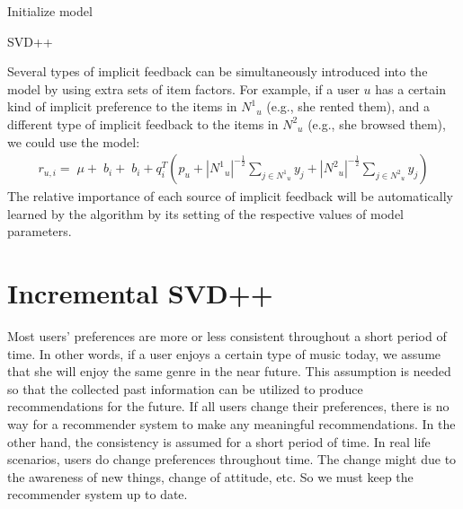 \documentclass[oneside,13pt]{extreport}
\begin{document}
\begin{algorithm}[H]
 Initialize model\;
 \caption{SVD++}
\end{algorithm}
\clearpage

Several types of implicit feedback can be simultaneously introduced into the
model by using extra sets of item factors. For example, if a user $u$ has a certain
kind of implicit preference to the items in ${N^1}_u$ (e.g., she rented them), and a different
type of implicit feedback to the items in ${N^2}_u$ (e.g., she browsed them), we
could use the model: 
\begin{eqnarray}
\label{eq:svd++_pre2}
{r_{u,i}} = \;\mu  + \;{b_i} + \;{b_i} + q_i^T\left( {{p_u} + {{\left| {{N^1}_u} \right|}^{ - \frac{1}{2}}}\sum\limits_{j  \in {N^1}_u} {{y_j}}  + {{\left| {{N^2}_u} \right|}^{ - \frac{1}{2}}}\sum\limits_{j \in   {N^2}_u} {{y_j}} } \right)
\end{eqnarray}
The relative importance of each source of implicit feedback will be automatically
learned by the algorithm by its setting of the respective values of model parameters.
\section{Incremental SVD++}
Most users’ preferences are more or less consistent throughout a short period of time. In other words, if a user enjoys a certain type of music today, we assume that she will enjoy the same genre in the near future. This assumption is needed so that the collected past information can be utilized to produce recommendations for the future. If all users change their preferences, there is no way for a recommender
system to make any meaningful recommendations. In the other hand, the consistency is assumed for a short period of time. In real life scenarios, users do change preferences throughout time. The change might due to the awareness of new things, change of attitude, etc. So we must keep the recommender system up to date.
\end{document}
